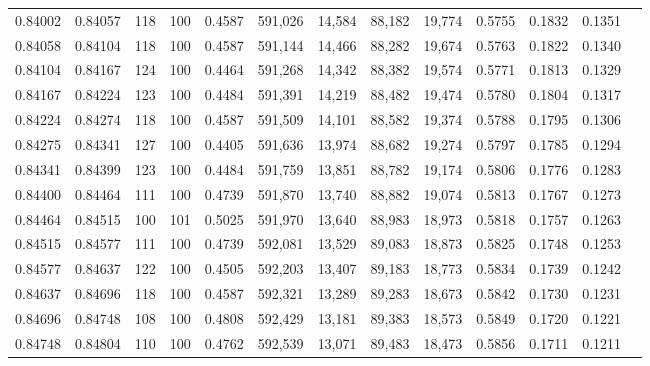 \begin{tabular}{rrrrrrrrrrrrr}
0.84002 & 0.84057 &   118 & 100 &                                     0.4587 & 591,026 &  14,584 &  88,182 &  19,774 & 0.5755 & 0.1832 & 0.1351 \\
0.84058 & 0.84104 &   118 & 100 &                                     0.4587 & 591,144 &  14,466 &  88,282 &  19,674 & 0.5763 & 0.1822 & 0.1340 \\
0.84104 & 0.84167 &   124 & 100 &                                     0.4464 & 591,268 &  14,342 &  88,382 &  19,574 & 0.5771 & 0.1813 & 0.1329 \\
0.84167 & 0.84224 &   123 & 100 &                                     0.4484 & 591,391 &  14,219 &  88,482 &  19,474 & 0.5780 & 0.1804 & 0.1317 \\
0.84224 & 0.84274 &   118 & 100 &                                     0.4587 & 591,509 &  14,101 &  88,582 &  19,374 & 0.5788 & 0.1795 & 0.1306 \\
0.84275 & 0.84341 &   127 & 100 &                                     0.4405 & 591,636 &  13,974 &  88,682 &  19,274 & 0.5797 & 0.1785 & 0.1294 \\
0.84341 & 0.84399 &   123 & 100 &                                     0.4484 & 591,759 &  13,851 &  88,782 &  19,174 & 0.5806 & 0.1776 & 0.1283 \\
0.84400 & 0.84464 &   111 & 100 &                                     0.4739 & 591,870 &  13,740 &  88,882 &  19,074 & 0.5813 & 0.1767 & 0.1273 \\
0.84464 & 0.84515 &   100 & 101 &                                     0.5025 & 591,970 &  13,640 &  88,983 &  18,973 & 0.5818 & 0.1757 & 0.1263 \\
0.84515 & 0.84577 &   111 & 100 &                                     0.4739 & 592,081 &  13,529 &  89,083 &  18,873 & 0.5825 & 0.1748 & 0.1253 \\
0.84577 & 0.84637 &   122 & 100 &                                     0.4505 & 592,203 &  13,407 &  89,183 &  18,773 & 0.5834 & 0.1739 & 0.1242 \\
0.84637 & 0.84696 &   118 & 100 &                                     0.4587 & 592,321 &  13,289 &  89,283 &  18,673 & 0.5842 & 0.1730 & 0.1231 \\
0.84696 & 0.84748 &   108 & 100 &                                     0.4808 & 592,429 &  13,181 &  89,383 &  18,573 & 0.5849 & 0.1720 & 0.1221 \\
0.84748 & 0.84804 &   110 & 100 &                                     0.4762 & 592,539 &  13,071 &  89,483 &  18,473 & 0.5856 & 0.1711 & 0.1211 \\

\end{tabular}
